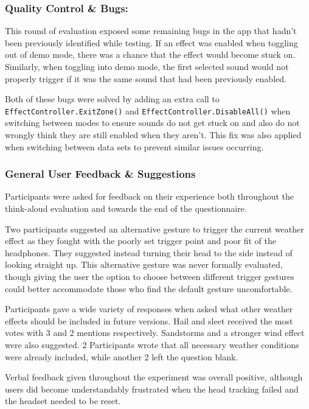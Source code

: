 \documentclass{l4proj}
\begin{document}
\subsubsection{Quality Control \& Bugs:}This round of evaluation exposed some remaining bugs in the app that hadn't been previously identified while testing. If an effect was enabled when toggling out of demo mode, there was a chance that the effect would become stuck on. Similarly, when toggling into demo mode, the first selected sound would not properly trigger if it was the same sound that had been previously enabled.

Both of these bugs were solved by adding an extra call to \texttt{EffectController.ExitZone()} and \texttt{EffectController.DisableAll()} when switching between modes to ensure sounds do not get stuck on and also do not wrongly think they are still enabled when they aren't. This fix was also applied when switching between data sets to prevent similar issues occurring.

\subsubsection{General User Feedback \& Suggestions} \label{sec:feedback}
Participants were asked for feedback on their experience both throughout the think-aloud evaluation and towards the end of the questionnaire.

Two participants suggested an alternative gesture to trigger the current weather effect as they fought with the poorly set trigger point and poor fit of the headphones. They suggested instead turning their head to the side instead of looking straight up. This alternative gesture was never formally evaluated, though giving the user the option to choose between different trigger gestures could better accommodate those who find the default gesture uncomfortable.

Participants gave a wide variety of responses when asked what other weather effects should be included in future versions. Hail and sleet received the most votes with 3 and 2 mentions respectively. Sandstorms and a stronger wind effect were also suggested. 2 Participants wrote that all necessary weather conditions were already included, while another 2 left the question blank.

Verbal feedback given throughout the experiment was overall positive, although users did become understandably frustrated when the head tracking failed and the headset needed to be reset.
\end{document}
